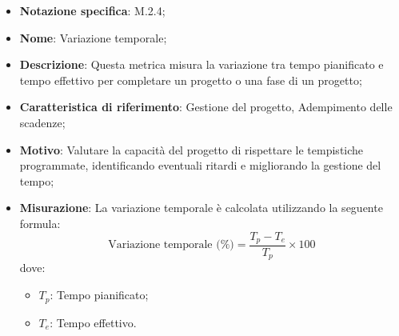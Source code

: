 \begin{itemize}
    \item \textbf{Notazione specifica}: M.2.4;
    \item \textbf{Nome}: Variazione temporale;
    \item \textbf{Descrizione}: Questa metrica misura la variazione tra tempo pianificato e tempo effettivo per completare un progetto o una fase di un progetto;
    \item \textbf{Caratteristica di riferimento}: Gestione del progetto, Adempimento delle scadenze;
    \item \textbf{Motivo}: Valutare la capacità del progetto di rispettare le tempistiche programmate, identificando eventuali ritardi e migliorando la gestione del tempo;
    \item \textbf{Misurazione}: La variazione temporale è calcolata utilizzando la seguente formula:
    \[
        \text{Variazione temporale (\%)} =\frac{T_p - T_e}{T_p} \times 100
    \]
    dove:
    \begin{itemize}
        \item $T_{p}$: Tempo pianificato;
        \item $T_{e}$: Tempo effettivo.
    \end{itemize}
\end{itemize}
